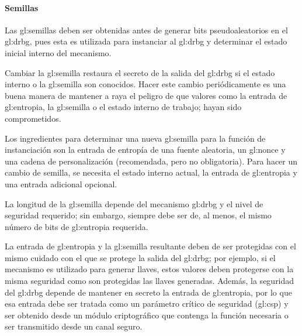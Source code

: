 %
%
\paragraph{Semillas}

Las \glspl{gl:semilla} deben ser obtenidas antes de generar bits
pseudoaleatorios en el \gls{gl:drbg}, pues esta es utilizada para instanciar al
\gls{gl:drbg} y determinar el estado inicial interno del mecanismo.

Cambiar la \gls{gl:semilla} restaura el secreto de la salida del \gls{gl:drbg}
si el estado interno o la \gls{gl:semilla} son conocidos. Hacer este cambio
periódicamente es una buena manera de mantener a raya el peligro de que valores
como la entrada de \gls{gl:entropia}, la \gls{gl:semilla} o el estado interno
de trabajo; hayan sido comprometidos.

Los ingredientes para determinar una nueva \gls{gl:semilla} para la función de
instanciación son la entrada de entropía de una fuente aleatoria, un
\gls{gl:nonce} y una cadena de personalización (recomendada, pero no
obligatoria). Para hacer un cambio de semilla, se necesita el estado interno
actual, la entrada de \gls{gl:entropia} y una entrada adicional opcional.

La longitud de la \gls{gl:semilla} depende del mecanismo \gls{gl:drbg} y el
nivel de seguridad requerido; sin embargo, siempre debe ser de, al menos, el
mismo número de bits de \gls{gl:entropia} requerida.

La entrada de \gls{gl:entropia} y la \gls{gl:semilla} resultante deben de ser
protegidas con el mismo cuidado con el que se protege la salida del
\gls{gl:drbg}; por ejemplo, si el mecanismo es utilizado para generar llaves,
estos valores deben protegerse con la misma seguridad como son protegidas las
llaves generadas. Además, la seguridad del \gls{gl:drbg} depende de mantener
en secreto la entrada de \gls{gl:entropia}, por lo que esa entrada debe ser
tratada como un parámetro crítico de seguridad (\gls{gl:csp}) y ser obtenido
desde un módulo criptográfico que contenga la función necesaria o ser
transmitido desde un canal seguro.

